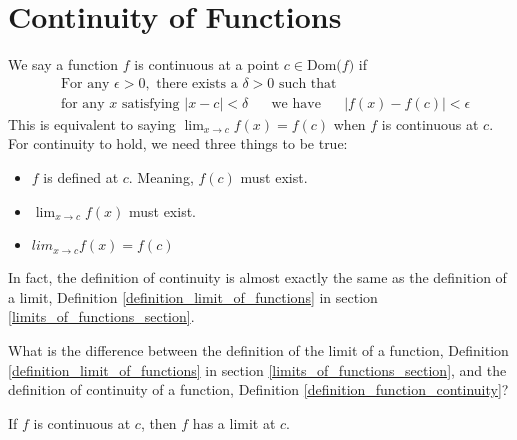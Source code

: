 \section{Continuity of Functions}

\begin{definition}
We say a function $f$ is continuous at a point $c \in \text{Dom($f$)}$ if
\begin{align*}
    &\text{For any} \hspace{4pt} \epsilon > 0, \hspace{4pt} \text{there exists a} \hspace{4pt} \delta > 0 \hspace{4pt} \text{such that}\\[2ex]
    &\text{for any} \hspace{4pt} x \hspace{4pt} \text{satisfying} \hspace{4pt} \lvert x - c \rvert < \delta \hspace{20pt} \text{we have} \hspace{20pt} \lvert f(x) - f(c) \rvert < \epsilon
\end{align*}
This is equivalent to saying $\lim_{x \longrightarrow c} f(x) = f(c)$ when $f$ is continuous at $c$. For continuity to hold, we need three things to be true:
\begin{itemize}
    \item $f$ is defined at $c$. Meaning, $f(c)$ must exist.
    \item $\lim_{x \longrightarrow c} f(x)$ must exist.
    \item $lim_{x \longrightarrow c} f(x) = f(c)$
\end{itemize}
In fact, the definition of continuity is almost exactly the same as the definition of a limit, Definition \ref{definition_limit_of_functions} in section \ref{limits_of_functions_section}.
\label{definition_function_continuity}
\end{definition}

\begin{exercise}
What is the difference between the definition of the limit of a function, Definition \ref{definition_limit_of_functions} in section \ref{limits_of_functions_section}, and the definition of continuity of a function, Definition \ref{definition_function_continuity}?
\end{exercise}

\begin{theorem}
If $f$ is continuous at $c$, then $f$ has a limit at $c$.
\end{theorem}


